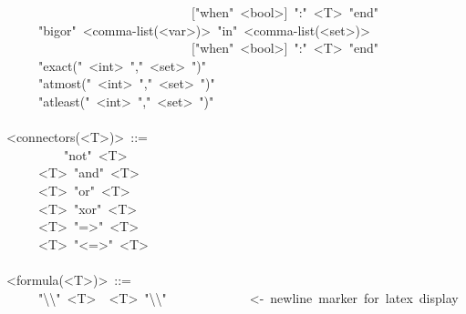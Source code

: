 \begin{mdpre}
~~~~~~~~~~~~~~~~~~~~~~~~~~~~~{}["when"~{\textless{}bool\textgreater{}}]~":"~{\textless{}T\textgreater{}}~"end"\\
~~~~\textbar{}~"bigor"~{\textless{}comma-list(\textless{}var\textgreater{})\textgreater{}}~"in"~{\textless{}comma-list(\textless{}set\textgreater{})\textgreater{}}\\
~~~~~~~~~~~~~~~~~~~~~~~~~~~~~{}["when"~{\textless{}bool\textgreater{}}]~":"~{\textless{}T\textgreater{}}~"end"\\
~~~~\textbar{}~"exact("~{\textless{}int\textgreater{}}~","~{\textless{}set\textgreater{}}~")"\\
~~~~\textbar{}~"atmost("~{\textless{}int\textgreater{}}~","~{\textless{}set\textgreater{}}~")"\\
~~~~\textbar{}~"atleast("~{\textless{}int\textgreater{}}~","~{\textless{}set\textgreater{}}~")"\\
\\
{\textless{}connectors(\textless{}T\textgreater{})\textgreater{}}~::=\\
~~~~\textbar{}~~~~~"not"~{\textless{}T\textgreater{}}\\
~~~~\textbar{}~{\textless{}T\textgreater{}}~"and"~{\textless{}T\textgreater{}}\\
~~~~\textbar{}~{\textless{}T\textgreater{}}~"or"~{\textless{}T\textgreater{}}\\
~~~~\textbar{}~{\textless{}T\textgreater{}}~"xor"~{\textless{}T\textgreater{}}\\
~~~~\textbar{}~{\textless{}T\textgreater{}}~"=\textgreater{}"~{\textless{}T\textgreater{}}\\
~~~~\textbar{}~{\textless{}T\textgreater{}}~"\textless{}=\textgreater{}"~{\textless{}T\textgreater{}}\\
\\
{\textless{}formula(\textless{}T\textgreater{})\textgreater{}}~::=\\
~~~~\textbar{}~"\textbackslash{}\textbackslash{}"~{\textless{}T\textgreater{}}~\textbar{}~{\textless{}T\textgreater{}}~"\textbackslash{}\textbackslash{}"~~~~~~~~~~~~~{\textless{}-~newline~marker~for~latex~display}\\

\end{mdpre}
